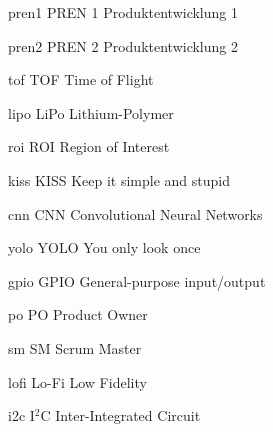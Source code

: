 \newacronym
  {pren1}                %
  {PREN 1}                %
  {Produktentwicklung 1}  %
  
\newacronym
  {pren2}                %
  {PREN 2}                %
  {Produktentwicklung 2}  %

\newacronym
  {tof}
  {TOF}
  {Time of Flight}
  
\newacronym
  {lipo}
  {LiPo}
  {Lithium-Polymer}

\newacronym
  {roi}
  {ROI}
  {Region of Interest}

\newacronym
 {kiss}
 {KISS}
 {Keep it simple and stupid}
 
\newacronym
 {cnn}
 {CNN}
 {Convolutional Neural Networks}
 
\newacronym
 {yolo}
 {YOLO}
 {You only look once}

\newacronym
 {gpio}
 {GPIO}
 {General-purpose input/output}

\newacronym
  {po}
  {PO}
  {Product Owner}
  
\newacronym
  {sm}
  {SM}
  {Scrum Master}

\newacronym
  {lofi}
  {Lo-Fi}
  {Low Fidelity}
  
 \newacronym
  {i2c}
  {I$^2$C}
  {Inter-Integrated Circuit}